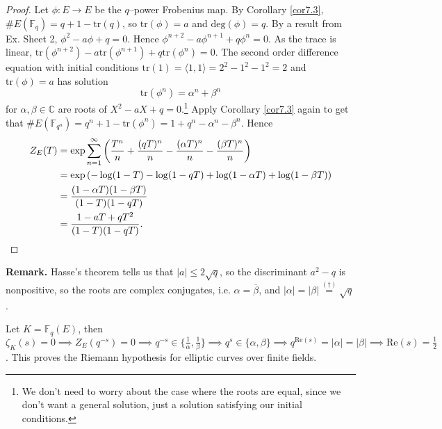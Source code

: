 \documentclass{article}
\theoremstyle{definition}
\begin{document}
\begin{proof}
    Let $\phi : E \to E$ be the $q$--power Frobenius map. By Corollary \ref{cor7.3}, $\# E(\mathbb{F}_q) = q+1 - \text{tr}(q)$, so $\text{tr}(\phi) = a$ and $\text{deg}(\phi) = q$. By a result from Ex. Sheet 2, $\phi^2 - a \phi + q = 0$. Hence $\phi^{n+2} - a \phi^{n+1}  + q \phi^n = 0$. As the trace is linear, $\text{tr}(\phi^{n+2})-a \text{tr}(\phi^{n+1}) + q \text{tr}(\phi^n) = 0$. The second order difference equation with initial conditions $\text{tr}(1)=\langle 1,1 \rangle = 2^2-1^2-1^2 = 2$ and $\text{tr}(\phi) = a$ has solution \[
    \text{tr}(\phi^n) = \alpha^n + \beta^n
    \]
    for $\alpha, \beta \in \mathbb{C}$ are roots of $X^2 - aX + q = 0$.\footnote{We don't need to worry about the case where the roots are equal, since we don't want a general solution, just a solution satisfying our initial conditions.} Apply Corollary \ref{cor7.3} again to get that $\#E(\mathbb{F}_{q^n}) = q^n +1 - \text{tr}(\phi^n) = 1 + q^n - \alpha^n - \beta^n$. Hence
    \begin{align*}
        Z_E(T) &= \exp \sum_{n=1}^{\infty} \left(\frac{T^n}{n}+\frac{(qT)^n}{n}-\frac{(\alpha T)^n}{n} - \frac{(\beta T)^n}{n} \right) \\
        &= \exp \left( -\log(1-T) - \log(1-qT) + \log(1-\alpha T)+ \log(1 - \beta T) \right) \\
        &= \frac{(1-\alpha T)(1 - \beta T)}{(1-T)(1-qT)} \\
        &= \frac{1-a T +qT^2}{(1-T)(1-qT)}.
        \qedhere
    \end{align*}
\end{proof}
\textbf{Remark.} Hasse's theorem tells us that $\left|a\right|\le 2\sqrt{q}$, so the discriminant $a^2-q$ is nonpositive, so the roots are complex conjugates, i.e. $\alpha = \overline{\beta}$, and $\left|\alpha\right|=\left|\beta\right|\stackrel{(\dagger)}{=} \sqrt{q}$.
\vspace{1mm}
 
Let $K = \mathbb{F}_q(E)$, then $\zeta_K(s) = 0 \implies  Z_E(q^{-s}) = 0 \implies q^{-s} \in \{\frac{1}{\alpha},\frac{1}{\beta}\} \implies q^s \in \{\alpha,\beta\} \implies q^{\text{Re}(s)} = \left|\alpha\right| = \left|\beta\right| \implies \text{Re}(s) = \frac{1}{2}$. This proves the Riemann hypothesis for elliptic curves over finite fields.
\end{document}
